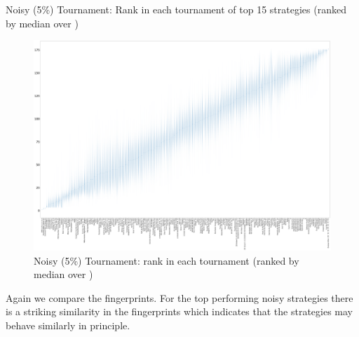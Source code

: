 \documentclass{article}
\begin{document}
\begin{table}[!hbtp]
    \centering
        
        \caption{Noisy (5\%) Tournament: Rank in each tournament
        of top 15 strategies (ranked by median over
        \protecttournaments)}
        \label{tbl:noisy_ranks}
\end{table}

\begin{landscape}
    \begin{figure}[!hbtp]
        \centering
        \includegraphics[width=\paperwidth]{./assets/noisy_ranks_boxplots.pdf}
        \caption{Noisy (5\%) Tournament: rank in each tournament (ranked by
        median over
        \protecttournaments)}
        \label{fig:noisy_ranks_boxplot}
    \end{figure}
\end{landscape}

Again we compare the fingerprints. For the top performing noisy strategies there
is a striking similarity in the fingerprints which indicates that the strategies
may behave similarly in principle.
\end{document}
